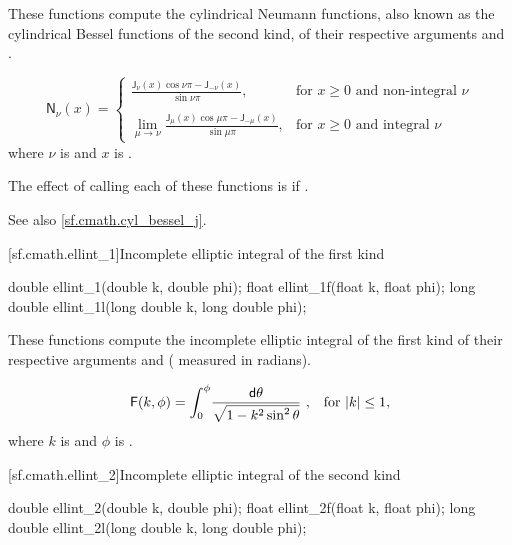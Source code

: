 \begin{itemdescr}

\pnum\effects
These functions compute the cylindrical Neumann functions,
also known as the cylindrical Bessel functions of the second kind,
of their respective arguments
 and .

\pnum\returns
\[%
  \mathsf{N}_\nu(x) =
  \left\{
  \begin{array}{cl}
  \displaystyle
  \frac{\mathsf{J}_\nu(x) \cos \nu\pi - \mathsf{J}_{-\nu}(x)}
       {\sin \nu\pi },
  & \mbox{for $x \ge 0$ and non-integral $\nu$}
  \\
  \\
  \displaystyle
  \lim_{\mu \rightarrow \nu} \frac{\mathsf{J}_\mu(x) \cos \mu\pi - \mathsf{J}_{-\mu}(x)}
                                {\sin \mu\pi },
  & \mbox{for $x \ge 0$ and integral $\nu$}
  \end{array}
  \right.
\]
where
$\nu$ is  and
$x$ is .

\pnum\remarks
The effect of calling each of these functions
is 
if .

\pnum See also \ref{sf.cmath.cyl_bessel_j}.
\end{itemdescr}

[sf.cmath.ellint_1]{Incomplete elliptic integral of the first kind}%
%
%
%
%
%
\begin{itemdecl}
double       ellint_1(double k, double phi);
float        ellint_1f(float k, float phi);
long double  ellint_1l(long double k, long double phi);
\end{itemdecl}

\begin{itemdescr}
\pnum
\effects
These functions compute
the incomplete elliptic integral of the first kind
of their respective arguments
 and  ( measured in radians).

\pnum
\returns
\[ \mathsf{F}(k, \phi) =
     \int_0^\phi \! \frac{\mathsf{d}\theta}{\sqrt{1 - k^2 \sin^2 \theta}}
     \text{ ,\quad for $|k| \le 1$,} \]
where
$k$ is  and
$\phi$ is .
\end{itemdescr}

[sf.cmath.ellint_2]{Incomplete elliptic integral of the second kind}%
%
%
%
%
%
\begin{itemdecl}
double       ellint_2(double k, double phi);
float        ellint_2f(float k, float phi);
long double  ellint_2l(long double k, long double phi);
\end{itemdecl}

